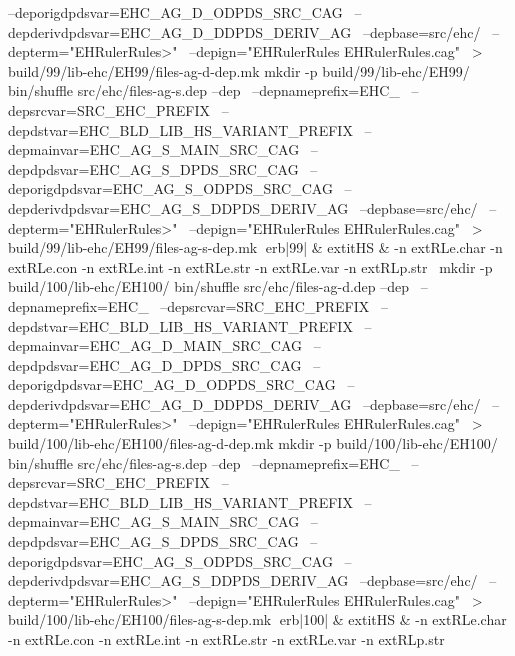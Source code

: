 	  --deporigdpdsvar=EHC_AG_D_ODPDS_SRC_CAG \
	  --depderivdpdsvar=EHC_AG_D_DDPDS_DERIV_AG \
	  --depbase=src/ehc/ \
	  --depterm="EHRulerRules>" \
	  --depign="EHRulerRules EHRulerRules.cag" \
	    > build/99/lib-ehc/EH99/files-ag-d-dep.mk
mkdir -p build/99/lib-ehc/EH99/
bin/shuffle src/ehc/files-ag-s.dep --dep \
	  --depnameprefix=EHC_ \
	  --depsrcvar=SRC_EHC_PREFIX \
	  --depdstvar=EHC_BLD_LIB_HS_VARIANT_PREFIX \
	  --depmainvar=EHC_AG_S_MAIN_SRC_CAG \
	  --depdpdsvar=EHC_AG_S_DPDS_SRC_CAG \
	  --deporigdpdsvar=EHC_AG_S_ODPDS_SRC_CAG \
	  --depderivdpdsvar=EHC_AG_S_DDPDS_DERIV_AG \
	  --depbase=src/ehc/ \
	  --depterm="EHRulerRules>" \
	  --depign="EHRulerRules EHRulerRules.cag" \
	    > build/99/lib-ehc/EH99/files-ag-s-dep.mk
erb|99| & 	extit{HS} & 
-n 	extRL{e.char}\hspace{.5em} 
-n 	extRL{e.con}\hspace{.5em} 
-n 	extRL{e.int}\hspace{.5em} 
-n 	extRL{e.str}\hspace{.5em} 
-n 	extRL{e.var}\hspace{.5em} 
-n 	extRL{p.str}\hspace{.5em} 
\
mkdir -p build/100/lib-ehc/EH100/
bin/shuffle src/ehc/files-ag-d.dep --dep \
	  --depnameprefix=EHC_ \
	  --depsrcvar=SRC_EHC_PREFIX \
	  --depdstvar=EHC_BLD_LIB_HS_VARIANT_PREFIX \
	  --depmainvar=EHC_AG_D_MAIN_SRC_CAG \
	  --depdpdsvar=EHC_AG_D_DPDS_SRC_CAG \
	  --deporigdpdsvar=EHC_AG_D_ODPDS_SRC_CAG \
	  --depderivdpdsvar=EHC_AG_D_DDPDS_DERIV_AG \
	  --depbase=src/ehc/ \
	  --depterm="EHRulerRules>" \
	  --depign="EHRulerRules EHRulerRules.cag" \
	    > build/100/lib-ehc/EH100/files-ag-d-dep.mk
mkdir -p build/100/lib-ehc/EH100/
bin/shuffle src/ehc/files-ag-s.dep --dep \
	  --depnameprefix=EHC_ \
	  --depsrcvar=SRC_EHC_PREFIX \
	  --depdstvar=EHC_BLD_LIB_HS_VARIANT_PREFIX \
	  --depmainvar=EHC_AG_S_MAIN_SRC_CAG \
	  --depdpdsvar=EHC_AG_S_DPDS_SRC_CAG \
	  --deporigdpdsvar=EHC_AG_S_ODPDS_SRC_CAG \
	  --depderivdpdsvar=EHC_AG_S_DDPDS_DERIV_AG \
	  --depbase=src/ehc/ \
	  --depterm="EHRulerRules>" \
	  --depign="EHRulerRules EHRulerRules.cag" \
	    > build/100/lib-ehc/EH100/files-ag-s-dep.mk
erb|100| & 	extit{HS} & 
-n 	extRL{e.char}\hspace{.5em} 
-n 	extRL{e.con}\hspace{.5em} 
-n 	extRL{e.int}\hspace{.5em} 
-n 	extRL{e.str}\hspace{.5em} 
-n 	extRL{e.var}\hspace{.5em} 
-n 	extRL{p.str}\hspace{.5em} 
